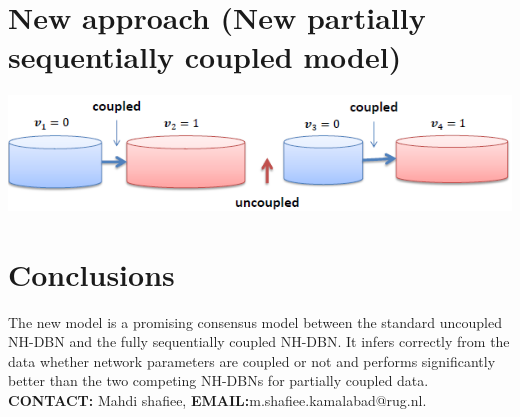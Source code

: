 \documentclass[a0paper,portrait]{baposter}
\begin{document}
\begin{poster}
{\section*{\normalsize{New approach (\normalsize{New partially sequentially coupled model)}}}
\vspace{-0.4cm}
\begin{center}
\includegraphics[width=0.75\linewidth]{changepoint5}
\end{center}
\vspace{-.5cm}
\vspace{-.5cm}
\section*{\normalsize{Conclusions}}
\vspace{-.4cm}
The new model is a promising consensus model between the standard uncoupled NH-DBN and the fully sequentially coupled NH-DBN. It infers correctly from the data whether network parameters are coupled or not and performs significantly better than the two competing NH-DBNs for partially coupled data.\\
{\bf CONTACT:} Mahdi shafiee, {\bf EMAIL:}m.shafiee.kamalabad@rug.nl.
}


\end{poster}
\end{document}
